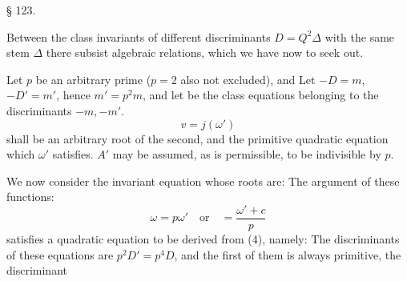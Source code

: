 \begin{center}
§ 123. \\
\end{center}

Between the class invariants of different discriminants $D = Q^2\Delta$ with the same stem $\Delta$ there subsist algebraic relations, which we have now to seek out.

Let $p$ be an arbitrary prime ($p = 2$ also not excluded), and
Let $-D = m$, $-D' = m'$, hence $m' = p^2 m$, and let
be the class equations belonging to the discriminants $-m, -m'$.
\[
v = j(\omega')
\]
shall be an arbitrary root of the second, and
the primitive quadratic equation which $\omega'$ satisfies. $A'$ may be assumed, as is permissible, to be indivisible by $p$.

We now consider the invariant equation
whose roots are:
The argument of these functions:
\[
\omega = p\omega' \quad \text{or} \quad = \frac{\omega' + c}{p}
\]
satisfies a quadratic equation to be derived from (4), namely:
The discriminants of these equations are $p^2D' = p^4D$, and the first of them is always primitive, the discriminant
